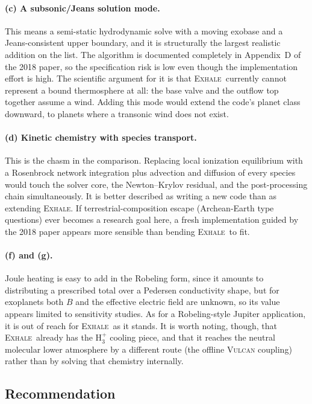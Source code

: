 \documentclass{my_memo}
\newcommand{\EXHALE}{\textsc{Exhale}}
\begin{document}
\paragraph{(c) A subsonic/Jeans solution mode.}
This means a semi-static hydrodynamic solve with a moving exobase and a Jeans-consistent upper
boundary, and it is structurally the largest realistic addition on the list. The algorithm is
documented completely in Appendix~D of the 2018 paper, so the specification risk is low even though
the implementation effort is high. The scientific argument for it is that \EXHALE\ currently
cannot represent a bound thermosphere at all: the base valve and the outflow top together assume a
wind. Adding this mode would extend the code's planet class downward, to planets where a transonic
wind does not exist.

\paragraph{(d) Kinetic chemistry with species transport.}
This is the chasm in the comparison. Replacing local ionization equilibrium with a Rosenbrock
network integration plus advection and diffusion of every species would touch the solver core, the
Newton--Krylov residual, and the post-processing chain simultaneously. It is better described as
writing a new code than as extending \EXHALE. If terrestrial-composition escape (Archean-Earth
type questions) ever becomes a research goal here, a fresh implementation guided by the 2018
paper appears more sensible than bending \EXHALE\ to fit.

\paragraph{(f) and (g).}
Joule heating is easy to add in the Robeling form, since it amounts to distributing a prescribed
total over a Pedersen conductivity shape, but for exoplanets both $B$ and the effective electric
field are unknown, so its value appears limited to sensitivity studies. As for a Robeling-style
Jupiter application, it is out of reach for \EXHALE\ as it stands. It is worth noting, though, that
\EXHALE\ already has the H$_3^+$ cooling piece, and that it reaches the neutral molecular lower
atmosphere by a different route (the offline \textsc{Vulcan} coupling) rather than by
solving that chemistry internally.

\subsection{Recommendation}
\end{document}
